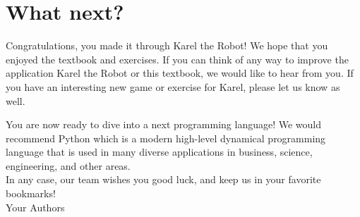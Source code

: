 \documentclass[article,A4,12pt]{llncs}
\begin{document}
\section{What next?}

Congratulations, you made it through Karel the Robot! We hope that you 
enjoyed the textbook and exercises. If you can think of any way to 
improve the application Karel the Robot or this textbook, we would like
to hear from you. If you have an interesting new game or exercise for 
Karel, please let us know as well. 

You are now ready to dive into a next programming language! We would 
recommend Python which is a modern high-level dynamical programming 
language that is used in many diverse applications in business, science,
engineering, and other areas.\\

\noindent
In any case, our team wishes you good luck, and keep us in your 
favorite bookmarks! \\

\hbox{} \hfill{} Your Authors
\end{document}
